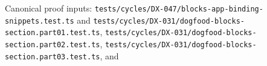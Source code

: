 \begin{itemize}
  Canonical proof inputs: \texttt{t\allowbreak{}e\allowbreak{}s\allowbreak{}t\allowbreak{}s\allowbreak{}/\allowbreak{}c\allowbreak{}y\allowbreak{}c\allowbreak{}l\allowbreak{}e\allowbreak{}s\allowbreak{}/\allowbreak{}D\allowbreak{}X\allowbreak{}-\allowbreak{}0\allowbreak{}4\allowbreak{}7\allowbreak{}/\allowbreak{}b\allowbreak{}l\allowbreak{}o\allowbreak{}c\allowbreak{}k\allowbreak{}s\allowbreak{}-\allowbreak{}a\allowbreak{}p\allowbreak{}p\allowbreak{}-\allowbreak{}b\allowbreak{}i\allowbreak{}n\allowbreak{}d\allowbreak{}i\allowbreak{}n\allowbreak{}g\allowbreak{}-\allowbreak{}s\allowbreak{}n\allowbreak{}i\allowbreak{}p\allowbreak{}p\allowbreak{}e\allowbreak{}t\allowbreak{}s\allowbreak{}.\allowbreak{}t\allowbreak{}e\allowbreak{}s\allowbreak{}t\allowbreak{}.\allowbreak{}t\allowbreak{}s} and \texttt{t\allowbreak{}e\allowbreak{}s\allowbreak{}t\allowbreak{}s\allowbreak{}/\allowbreak{}c\allowbreak{}y\allowbreak{}c\allowbreak{}l\allowbreak{}e\allowbreak{}s\allowbreak{}/\allowbreak{}D\allowbreak{}X\allowbreak{}-\allowbreak{}0\allowbreak{}3\allowbreak{}1\allowbreak{}/\allowbreak{}d\allowbreak{}o\allowbreak{}g\allowbreak{}f\allowbreak{}o\allowbreak{}o\allowbreak{}d\allowbreak{}-\allowbreak{}b\allowbreak{}l\allowbreak{}o\allowbreak{}c\allowbreak{}k\allowbreak{}s\allowbreak{}-\allowbreak{}s\allowbreak{}e\allowbreak{}c\allowbreak{}t\allowbreak{}i\allowbreak{}o\allowbreak{}n\allowbreak{}.\allowbreak{}p\allowbreak{}a\allowbreak{}r\allowbreak{}t\allowbreak{}0\allowbreak{}1\allowbreak{}.\allowbreak{}t\allowbreak{}e\allowbreak{}s\allowbreak{}t\allowbreak{}.\allowbreak{}t\allowbreak{}s}, \texttt{t\allowbreak{}e\allowbreak{}s\allowbreak{}t\allowbreak{}s\allowbreak{}/\allowbreak{}c\allowbreak{}y\allowbreak{}c\allowbreak{}l\allowbreak{}e\allowbreak{}s\allowbreak{}/\allowbreak{}D\allowbreak{}X\allowbreak{}-\allowbreak{}0\allowbreak{}3\allowbreak{}1\allowbreak{}/\allowbreak{}d\allowbreak{}o\allowbreak{}g\allowbreak{}f\allowbreak{}o\allowbreak{}o\allowbreak{}d\allowbreak{}-\allowbreak{}b\allowbreak{}l\allowbreak{}o\allowbreak{}c\allowbreak{}k\allowbreak{}s\allowbreak{}-\allowbreak{}s\allowbreak{}e\allowbreak{}c\allowbreak{}t\allowbreak{}i\allowbreak{}o\allowbreak{}n\allowbreak{}.\allowbreak{}p\allowbreak{}a\allowbreak{}r\allowbreak{}t\allowbreak{}0\allowbreak{}2\allowbreak{}.\allowbreak{}t\allowbreak{}e\allowbreak{}s\allowbreak{}t\allowbreak{}.\allowbreak{}t\allowbreak{}s}, \texttt{t\allowbreak{}e\allowbreak{}s\allowbreak{}t\allowbreak{}s\allowbreak{}/\allowbreak{}c\allowbreak{}y\allowbreak{}c\allowbreak{}l\allowbreak{}e\allowbreak{}s\allowbreak{}/\allowbreak{}D\allowbreak{}X\allowbreak{}-\allowbreak{}0\allowbreak{}3\allowbreak{}1\allowbreak{}/\allowbreak{}d\allowbreak{}o\allowbreak{}g\allowbreak{}f\allowbreak{}o\allowbreak{}o\allowbreak{}d\allowbreak{}-\allowbreak{}b\allowbreak{}l\allowbreak{}o\allowbreak{}c\allowbreak{}k\allowbreak{}s\allowbreak{}-\allowbreak{}s\allowbreak{}e\allowbreak{}c\allowbreak{}t\allowbreak{}i\allowbreak{}o\allowbreak{}n\allowbreak{}.\allowbreak{}p\allowbreak{}a\allowbreak{}r\allowbreak{}t\allowbreak{}0\allowbreak{}3\allowbreak{}.\allowbreak{}t\allowbreak{}e\allowbreak{}s\allowbreak{}t\allowbreak{}.\allowbreak{}t\allowbreak{}s}, and 
\end{itemize}
